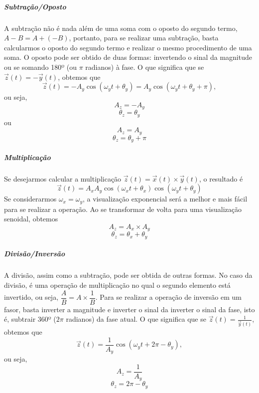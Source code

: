 \documentclass[conference,harvard, brazil]{sbatex}
\begin{document}
	\subparagraph{Subtração/Oposto}A subtração não é nada além de uma soma com o oposto do segundo termo, $A-B=A+(-B)$, portanto, para se realizar uma subtração, basta calcularmos o oposto do segundo termo e realizar o mesmo procedimento de uma soma. O oposto pode ser obtido de duas formas: invertendo o sinal da magnitude ou se somando 180º (ou $\pi$ radianos) à fase. O que significa que se $\overrightarrow{z}(t)=-\overrightarrow{y}(t)$, obtemos que
	\begin{equation*}
		\overrightarrow{z}(t) = -A_y\cos(\omega_yt+\theta_y) = A_y\cos(\omega_yt+\theta_y+\pi),
	\end{equation*}
	ou seja,
	\begin{equation*}
		A_z=-A_y
	\end{equation*}
	\begin{equation*}
		\theta_z=\theta_y
	\end{equation*}
	ou
	\begin{equation*}
		A_z=A_y
	\end{equation*}
	\begin{equation}
		\theta_z=\theta_y+\pi
		\label{eq:sub}
	\end{equation}
	
	\subparagraph{Multiplicação}Se desejarmos calcular a multiplicação $\overrightarrow{z}(t) = \overrightarrow{x}(t)\times\overrightarrow{y}(t)$, o resultado é
	\begin{equation*}
		\overrightarrow{z}(t) = A_xA_y\cos(\omega_xt+\theta_x)\cos(\omega_yt+\theta_y)
	\end{equation*}
	Se considerarmos  $\omega_x=\omega_y$, a visualização exponencial será a melhor e mais fácil para se realizar a operação. Ao se transformar de volta para uma visualização senoidal, obtemos
	\begin{equation*}
		A_z=A_x\times A_y
	\end{equation*}
	\begin{equation}
		\theta_z=\theta_x+\theta_y
		\label{eq:mult}
	\end{equation}
	
	\subparagraph{Divisão/Inversão}A divisão, assim como a subtração, pode ser obtida de outras formas. No caso da divisão, é uma operação de multiplicação no qual o segundo elemento está invertido, ou seja, $\dfrac{A}{B} = A\times\dfrac{1}{B}$. Para se realizar a operação de inversão em um fasor, basta inverter a magnitude e inverter o sinal da inverter o sinal da fase, isto é, subtrair 360º ($2\pi$ radianos) da fase atual. O que significa que se $\overrightarrow{z}(t)=\tfrac{1}{\overrightarrow{y}(t)}$, obtemos que
	\begin{equation*}
		\overrightarrow{z}(t) = \dfrac{1}{A_y}\cos(\omega_yt+2\pi-\theta_y),
	\end{equation*}
	ou seja,
	\begin{equation*}
		A_z=\dfrac{1}{A_y}
	\end{equation*}
	\begin{equation}
		\theta_z=2\pi-\theta_y
		\label{eq:div}
	\end{equation}
	
\end{document}

